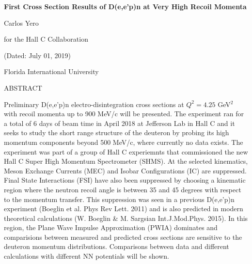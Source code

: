 \documentclass[a4paper]{article}
\begin{document}

\Large
 \begin{center}
\textbf{First Cross Section Results of D(e,e'p)n at Very High Recoil Momenta\\} 

\hspace{10pt}

\large
Carlos Yero \\

\hspace{10pt}

\small
for the Hall C Collaboration

\hspace{10pt}

\small
(Dated: July 01, 2019) \\

\hspace{10pt}

\small  
Florida International University\\

\end{center}

\hspace{10pt}

\large
\begin{center}
ABSTRACT
\end{center}
\normalsize

\noindent Preliminary D(e,e'p)n electro-disintegration cross sections at $Q^{2} = 4.25$ GeV$^{2}$ with recoil
momenta up to 900 MeV/c will be presented. The experiment ran for a total of 6 days of beam time in April 2018
at Jefferson Lab in Hall C and it seeks to study the short range structure of the deuteron by probing its high
momentum components beyond 500 MeV/c, where currently no data exists. The experiment was part of a group of Hall C
experiemnts that commissioned the new Hall C Super High Momentum Spectrometer (SHMS). At the selected kinematics,
Meson Exchange Currents (MEC) and Isobar Configurations (IC) are suppressed. Final State Interactions (FSI) have also
been suppressed by choosing a kinematic region where the neutron recoil angle is between 35 and 45 degrees with respect
to the momentum transfer. This suppression was seen in a previous D(e,e'p)n experiment (Boeglin et al. Phys Rev Lett. 2011)
and is also predicted in modern theoretical calculations (W. Boeglin \& M. Sargsian Int.J.Mod.Phys. 2015). In this region,
the Plane Wave Impulse Approximation (PWIA) dominates and comparisions between measured and predicted cross sections are
sensitive to the deuteron momentum distributions. Comparisons between data and different calculations with different NN
potentials will be shown.
\end{document}
